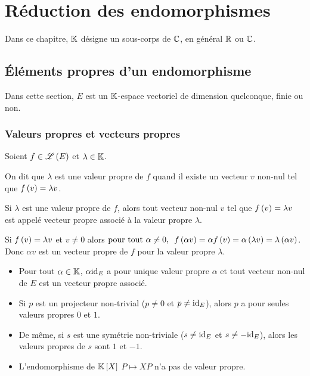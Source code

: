 \chapter{Réduction des endomorphismes}

\minitoc

Dans ce chapitre, \(\mathbb{K}\) désigne un sous-corps de \(\mathbb{C}\), en général \(\mathbb{R}\) ou \(\mathbb{C}\).

\section{Éléments propres d'un endomorphisme}

Dans cette section, \(E\) est un \(\mathbb{K}\)-espace vectoriel de dimension quelconque, finie ou non.

\subsection{Valeurs propres et vecteurs propres}

\begin{defi}
Soient \(f\in\mathscr{L}\left(E\right)\) et \(\lambda\in\mathbb{K}\).

On dit que \(\lambda\) est une valeur propre de \(f\) quand il existe un vecteur \(v\) non-nul tel que \(f\left(v\right)=\lambda v\).

Si \(\lambda\) est une valeur propre de \(f\), alors tout vecteur non-nul \(v\) tel que \(f\left(v\right)=\lambda v\) est appelé vecteur propre associé à la valeur propre \(\lambda\).
\end{defi}

\begin{rem}
Si \(f\left(v\right)=\lambda v\) et \(v\not=0\) alors \(\quantifs{\tpt\alpha\not=0}f\paren{\alpha v}=\alpha f\paren{v}=\alpha\paren{\lambda v}=\lambda\paren{\alpha v}\). Donc \(\alpha v\) est un vecteur propre de \(f\) pour la valeur propre \(\lambda\).
\end{rem}

\begin{ex}
\begin{itemize}
    \item Pour tout \(\alpha\in\mathbb{K}\), \(\alpha\mathrm{id}_{E}\) a pour unique valeur propre \(\alpha\) et tout vecteur non-nul de \(E\) est un vecteur propre associé. \\
    \item Si \(p\) est un projecteur non-trivial (\ie \(p\not=0\) et \(p\not=\mathrm{id}_{E}\)), alors \(p\) a pour seules valeurs propres \(0\) et \(1\). \\
    \item De même, si \(s\) est une symétrie non-triviale (\ie \(s\not=\mathrm{id}_{E}\) et \(s\not=-\mathrm{id}_{E}\)), alors les valeurs propres de \(s\) sont \(1\) et \(-1\). \\
    \item L'endomorphisme de \(\poly\) \(P\mapsto XP\) n'a pas de valeur propre.
\end{itemize}
\end{ex}

